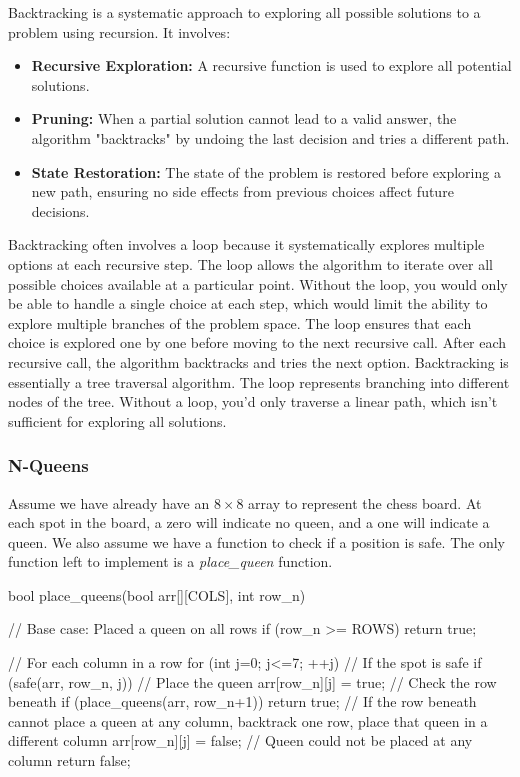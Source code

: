 \documentclass{report}
\begin{document}
\pagebreak 
Backtracking is a systematic approach to exploring all possible solutions to a problem using recursion. It involves:
\begin{itemize}
    \item \textbf{Recursive Exploration:} A recursive function is used to explore all potential solutions.
    \item \textbf{Pruning:} When a partial solution cannot lead to a valid answer, the algorithm "backtracks" by undoing the last decision and tries a different path.
    \item \textbf{State Restoration:} The state of the problem is restored before exploring a new path, ensuring no side effects from previous choices affect future decisions.
\end{itemize}
\bigbreak \noindent 
Backtracking often involves a loop because it systematically explores multiple options at each recursive step. The loop allows the algorithm to iterate over all possible choices available at a particular point. Without the loop, you would only be able to handle a single choice at each step, which would limit the ability to explore multiple branches of the problem space.
\bigbreak \noindent 
The loop ensures that each choice is explored one by one before moving to the next recursive call. After each recursive call, the algorithm backtracks and tries the next option.
\bigbreak \noindent 
Backtracking is essentially a tree traversal algorithm. The loop represents branching into different nodes of the tree. Without a loop, you'd only traverse a linear path, which isn't sufficient for exploring all solutions.
\bigbreak \noindent 
\subsubsection{N-Queens}
\bigbreak \noindent 
Assume we have already have an $8\times 8$ array to represent the chess board. At each spot in the board, a zero will indicate no queen, and a one will indicate a queen. We also assume we have a function to check if a position is safe. The only function left to implement is a \textit{place\_queen} function.
\bigbreak \noindent 
\begin{cppcode}
    bool place_queens(bool arr[][COLS], int row_n) { 
        // Base case: Placed a queen on all rows
        if (row_n >= ROWS)
        return true;

        // For each column in a row
        for (int j=0; j<=7; ++j) {
            // If the spot is safe
            if (safe(arr, row_n, j)) {
                // Place the queen
                arr[row_n][j] = true;
                // Check the row beneath
                if (place_queens(arr, row_n+1)) {
                    return true;
                }
                // If the row beneath cannot place a queen at any column, backtrack one row, place that queen in a different column
                arr[row_n][j] = false;
            }
        }
        // Queen could not be placed at any column
        return false;
    }
\end{cppcode}
\end{document}
